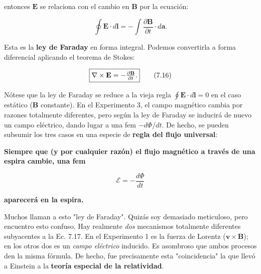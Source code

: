 \documentclass[12pt,a4paper]{report}
\newcommand{\esp}{\vspace{0.5cm}}
\begin{document}
	\esp
	
	entonces $\mathbf{E}$ se relaciona con el cambio en $\mathbf{B}$ por la ecuación:
	
	\esp
	
	\begin{equation}
		\oint \mathbf{E} \cdot d\mathbf{l} = -\int \frac{\partial \mathbf{B}}{\partial t} \cdot d\mathbf{a}. \tag{7.15}
	\end{equation}
	
	\esp
	
	Esta es la \textbf{ley de Faraday} en forma integral. Podemos convertirla a forma diferencial aplicando el teorema de Stokes:
	
	\esp
	
	\begin{equation}
		\fbox{$\nabla \times \mathbf{E} = -\frac{\partial \mathbf{B}}{\partial t}.$} \tag{7.16}
	\end{equation}
	
	\esp
	
	Nótese que la ley de Faraday se reduce a la vieja regla $\oint \mathbf{E} \cdot d\mathbf{l} = 0$ en el caso estático ($\mathbf{B}$ constante). En el Experimento 3, el campo magnético cambia por razones totalmente diferentes, pero según la ley de Faraday se inducirá de nuevo un campo eléctrico, dando lugar a una fem $-d\Phi/dt$. De hecho, se pueden subsumir los tres casos en una especie de \textbf{regla del flujo universal}:
	
	\esp
	
	\begin{center}
		\textbf{Siempre que (y por cualquier razón) el flujo magnético a través de una espira cambie, una fem}
	\end{center}
	
	\begin{equation}
		\mathcal{E} = -\frac{d\Phi}{dt} \tag{7.17}
	\end{equation}
	
	\begin{center}
		\textbf{aparecerá en la espira.}
	\end{center}
	
	\esp
	
	Muchos llaman a esto "ley de Faraday". Quizás soy demasiado meticuloso, pero encuentro esto confuso. Hay realmente \textit{dos} mecanismos totalmente diferentes subyacentes a la Ec. 7.17. En el Experimento 1 es la fuerza de Lorentz ($\mathbf{v} \times \mathbf{B}$); en los otros dos es un \textit{campo eléctrico} inducido. Es asombroso que ambos procesos den la misma fórmula. De hecho, fue precisamente esta "coincidencia" la que llevó a Einstein a la \textbf{teoría especial de la relatividad}.
	
\end{document}
